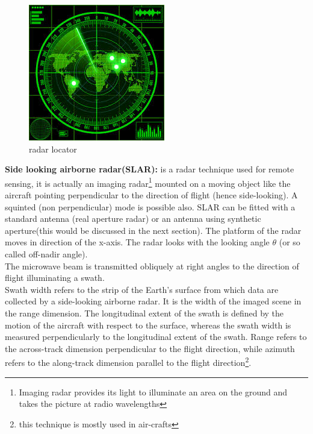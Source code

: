 \begin{figure}[h]
\centering
\includegraphics[scale=0.5]{./graphics/Radarlocator}
\caption{radar locator}
\end{figure}
\textbf{Side looking airborne radar(SLAR):} is a radar technique used for remote sensing, it is actually an imaging radar\footnote{Imaging radar provides its light to illuminate an area on the ground and takes the picture at radio wavelengths} mounted on a moving object like the aircraft pointing perpendicular to the direction of flight (hence side-looking). A squinted (non perpendicular) mode is possible also. SLAR can be fitted with a standard antenna (real aperture radar) or an antenna using synthetic aperture(this would be discussed in the next section). The platform of the radar moves in direction of the x-axis. The radar looks with the looking angle $\theta$ (or so called off-nadir angle).\\

The microwave beam is transmitted obliquely at right angles to the direction of flight illuminating a swath.\\
Swath width refers to the strip of the Earth's surface from which data are collected by a side-looking airborne radar. It is the width of the imaged scene in the range dimension. The longitudinal extent of the swath is defined by the motion of the aircraft with respect to the surface, whereas the swath width is measured perpendicularly to the longitudinal extent of the swath. Range refers to the across-track dimension perpendicular to the flight direction, while azimuth refers to the along-track dimension parallel to the flight direction\footnote{this technique is mostly used in air-crafts}.\\

